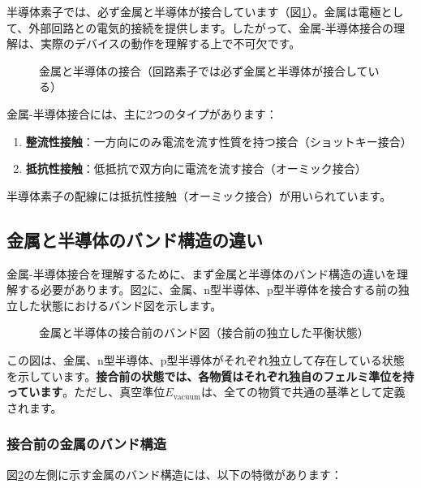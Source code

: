 半導体素子では、必ず金属と半導体が接合しています（図\ref{fig:metal_semiconductor_necessity}）。金属は電極として、外部回路との電気的接続を提供します。したがって、金属-半導体接合の理解は、実際のデバイスの動作を理解する上で不可欠です。

\begin{figure}[H]
\centering
{}
\caption{金属と半導体の接合（回路素子では必ず金属と半導体が接合している）}
\label{fig:metal_semiconductor_necessity}
\end{figure}

金属-半導体接合には、主に2つのタイプがあります：
\begin{enumerate}
\item \textbf{整流性接触}：一方向にのみ電流を流す性質を持つ接合（ショットキー接合）
\item \textbf{抵抗性接触}：低抵抗で双方向に電流を流す接合（オーミック接合）
\end{enumerate}

半導体素子の配線には抵抗性接触（オーミック接合）が用いられています。

\subsection{金属と半導体のバンド構造の違い}

金属-半導体接合を理解するために、まず金属と半導体のバンド構造の違いを理解する必要があります。図\ref{fig:metal_semiconductor_band}に、金属、n型半導体、p型半導体を接合する前の独立した状態におけるバンド図を示します。

\begin{figure}[H]
\centering
{}
\caption{金属と半導体の接合前のバンド図（接合前の独立した平衡状態）}
\label{fig:metal_semiconductor_band}
\end{figure}

この図は、金属、n型半導体、p型半導体がそれぞれ独立して存在している状態を示しています。\textbf{接合前の状態では、各物質はそれぞれ独自のフェルミ準位を持っています}。ただし、真空準位$E_{\text{vacuum}}$は、全ての物質で共通の基準として定義されます。

\subsubsection{接合前の金属のバンド構造}

図\ref{fig:metal_semiconductor_band}の左側に示す金属のバンド構造には、以下の特徴があります：

